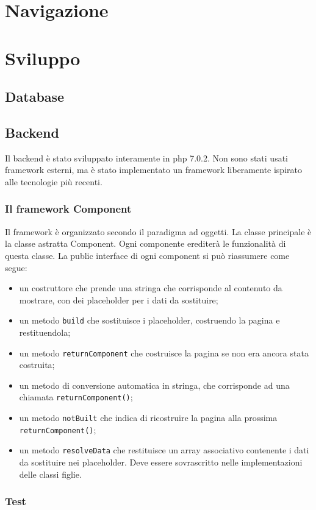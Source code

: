 \documentclass[12pt, a4paper]{article}
\begin{document}
\section{Navigazione}

\section{Sviluppo}
\subsection{Database}
\subsection{Backend}
Il backend è stato sviluppato interamente in php 7.0.2. Non sono stati usati framework esterni, ma è stato implementato un framework liberamente ispirato alle tecnologie più recenti. 
\subsubsection{Il framework Component}
Il framework è organizzato secondo il paradigma ad oggetti. La classe principale è la classe astratta Component. Ogni componente erediterà le funzionalità di questa classe. La public interface di ogni component si può riassumere come segue:
\begin{itemize}
\item un costruttore che prende una stringa che corrisponde al contenuto da mostrare, con dei placeholder per i dati da sostituire;
\item un metodo \texttt{build} che sostituisce i placeholder, costruendo la pagina e restituendola;
\item un metodo \texttt{returnComponent} che costruisce la pagina se non era ancora stata costruita;
\item un metodo di conversione automatica in stringa, che corrisponde ad una chiamata \texttt{returnComponent()};
\item un metodo \texttt{notBuilt} che indica di ricostruire la pagina alla prossima \texttt{returnComponent()};
\item un metodo \texttt{resolveData} che restituisce un array associativo contenente i dati da sostituire nei placeholder. Deve essere sovrascritto nelle implementazioni delle classi figlie.
\end{itemize}
\subsubsection{Test}
\end{document}
